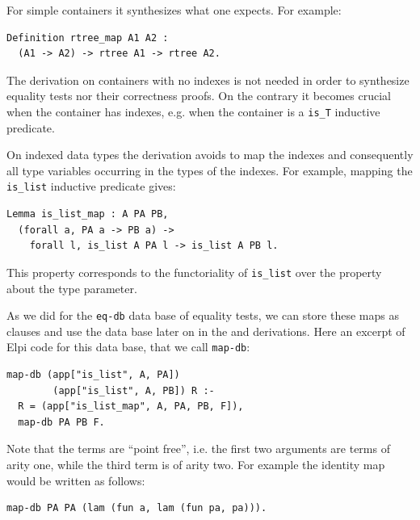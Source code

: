 \documentclass[sigplan,10pt,review]{acmart}\settopmatter{printfolios=true,printccs=false,printacmref=false}
\newcommand{\derive}[1]{\keys{#1}}
\begin{document}
For simple containers it synthesizes what one expects. For example:

\begin{minipage}{\textwidth}\begin{lstlisting}
Definition rtree_map A1 A2 :
  (A1 -> A2) -> rtree A1 -> rtree A2.
\end{lstlisting}\end{minipage}

The derivation on containers with no indexes is not needed in order
to synthesize equality tests nor their correctness proofs.
On the contrary it becomes crucial when the container has indexes,
e.g. when the container is a \lstinline+is_T+ inductive predicate.

On indexed data types the derivation avoids to map the indexes and
consequently all type variables occurring in the types of the indexes.
For example, mapping the \lstinline+is_list+ inductive predicate gives:

\begin{minipage}{\textwidth}\begin{lstlisting}
Lemma is_list_map : A PA PB,
  (forall a, PA a -> PB a) ->
    forall l, is_list A PA l -> is_list A PB l.
\end{lstlisting}\end{minipage}

\noindent
This property corresponds to the functoriality of \lstinline+is_list+
over the property about the type parameter. 

As we did for the \lstinline+eq-db+ data base of equality tests, we
can store these maps as clauses and use the data base later on in the
\derive{induction} and \derive{eqcorrect} derivations.
Here an excerpt of Elpi code for this data base, that we call
\lstinline+map-db+:

\begin{minipage}{\textwidth}\begin{lstlisting}[]
map-db (app["is_list", A, PA])
        (app["is_list", A, PB]) R :-
  R = (app["is_list_map", A, PA, PB, F]),
  map-db PA PB F.
\end{lstlisting}\end{minipage}

\noindent
Note that the terms are ``point free'', i.e.
the first two arguments are terms of arity one, while
the third term is of arity two. For example the identity
map would be written as follows:

\begin{minipage}{\textwidth}\begin{lstlisting}[]
map-db PA PA (lam (fun a, lam (fun pa, pa))).
\end{lstlisting}\end{minipage}
\end{document}
